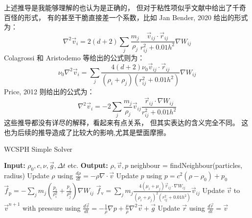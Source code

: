\begin{frame}
    上述推导是我能够理解的也认为是正确的，
    但对于粘性项似乎文献中给出了千奇百怪的形式，
    有的甚至干脆直接差一个系数，比如 Jan Bender, 2020 给出的形式为：
    \begin{equation}
        \nabla^2\vec{v}_i =
        2(d+2)\sum_j
        \frac{m_j}{\rho_j}
        \frac{\vec{v}_{ij}\cdot \vec{r}_{ij}}{r_{ij}^2 + 0.01h^2}
        \nabla W_{ij}
    \end{equation}
    Colagrossi 和 Aristodemo 等给出的公式则为：
    \begin{equation}
        \nu_0 \nabla^2\vec{v}_i =
        \sum_j 
        \frac{4(d+2)\nu_0 \vec{v}_{ij}\cdot \vec{r}_{ij}}{(\rho_i + \rho_j)(r_{ij}^2 + 0.01h^2)}
        \nabla W_{ij}
    \end{equation}
    Price, 2012 则给出的公式为：
    \begin{equation}
        \nabla^2\vec{v}_i =
        -2\sum_j
        \frac{m_j}{\rho_j}
        \vec{v}_{ij}\frac{\vec{r}_{ij}\cdot\nabla W_{ij}}{r_{ij}^2+0.01h^2}
    \end{equation}
    这些推导都没有详尽的解释，看起来有点关系，
    但其实表达的含义完全不同。
    这也为后续的推导造成了比较大的影响,尤其是壁面摩擦。
\end{frame}

\begin{frame}
    \begin{algorithm}[H]
        \caption{WCSPH Simple Solver}
        \begin{algorithmic}[1]
            \State \textbf{Input:} $\rho_0, c, \nu, \vec{g}, \Delta t$ etc.
            \State \textbf{Output:} $\rho, \vec{v}, p$
                \State neighbour = findNeighbour(particles, radius)
                    \State Update $\rho$ using $\frac{d\rho}{dt}= -\rho \nabla\cdot \vec{v}$
                \EndFor
                    \State Update $p$ using $p = c^2(\rho - \rho_0)+p_0$
                \EndFor
                    \State $\vec{f}_{\text{p}}= -\sum_j m_j \left(\frac{p_i}{\rho_i^2} + \frac{p_j}{\rho_j^2}\right) \nabla W_{ij}$
                    \State $\vec{f}_{\text{v}}= \sum_j m_j \frac{4 (\mu_i + \mu_j) \vec{r}_{ij}\cdot \nabla W_{ij}}{(\rho_i + \rho_j)^2 (r_{ij}^2 + 0.01h^2)}\vec{v}_{ij}$
                \EndFor
                    \State Update $\vec{v}$ to $\vec{v}^{n+1}$ with pressure using $\frac{d\vec{v}}{dt}= -\frac{1}{\rho}\nabla p+\frac{\mu}{\rho} \nabla^2 \vec{v}+\vec{g}$
                    \State Update $\vec{r}$ using $\frac{d\vec{r}}{dt}= \vec{v}$
                \EndFor
            \EndWhile
        \end{algorithmic}
    \end{algorithm}
\end{frame}